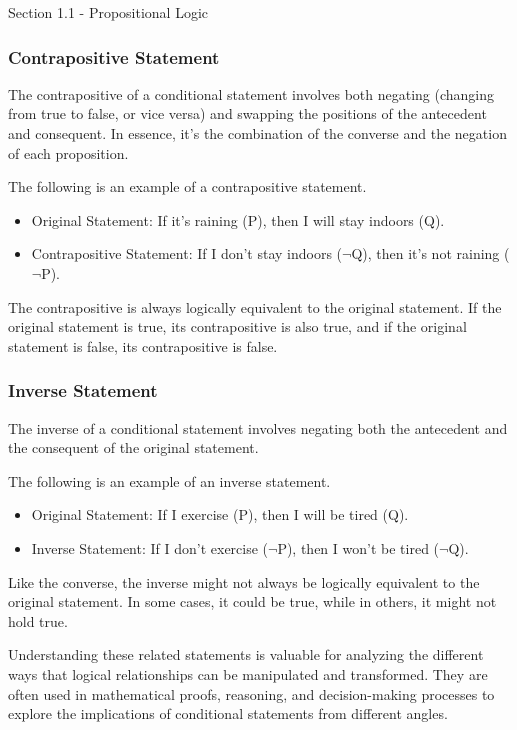 \begin{notes}{Section 1.1 - Propositional Logic}
    \subsubsection*{Contrapositive Statement}

    The contrapositive of a conditional statement involves both negating (changing from true to false, or vice versa) and swapping the positions of the antecedent and consequent. In essence, it's the combination of the converse 
    and the negation of each proposition.

    \begin{Highlight}
        The following is an example of a contrapositive statement.

        \begin{itemize}
            \item Original Statement: If it's raining (P), then I will stay indoors (Q).
            \item Contrapositive Statement: If I don't stay indoors ($\neg$Q), then it's not raining ($\neg$P).
        \end{itemize}

        The contrapositive is always logically equivalent to the original statement. If the original statement is true, its contrapositive is also true, and if the original statement is false, its contrapositive is false.
    \end{Highlight}

    \subsubsection*{Inverse Statement}

    The inverse of a conditional statement involves negating both the antecedent and the consequent of the original statement.

    \begin{Highlight}
        The following is an example of an inverse statement.

        \begin{itemize}
            \item Original Statement: If I exercise (P), then I will be tired (Q).
            \item Inverse Statement: If I don't exercise ($\neg$P), then I won't be tired ($\neg$Q).
        \end{itemize}

        Like the converse, the inverse might not always be logically equivalent to the original statement. In some cases, it could be true, while in others, it might not hold true.
    \end{Highlight}

    Understanding these related statements is valuable for analyzing the different ways that logical relationships can be manipulated and transformed. They are often used in mathematical proofs, reasoning, and decision-making 
    processes to explore the implications of conditional statements from different angles.
\end{notes}


